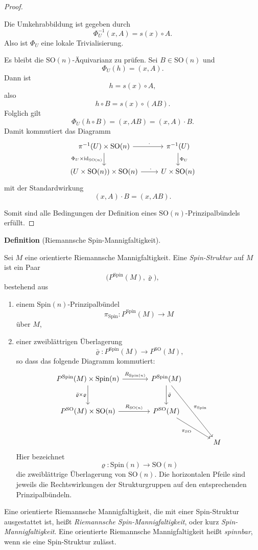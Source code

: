 \documentclass[10pt, letterpaper]{article}
\newcommand{\id}{\operatorname{id}}
\newcommand{\SO}{\mathrm{SO}}
\newcommand{\Spin}{\mathrm{Spin}}
\newcommand{\CustomHeading}[3]{%
  \par\medskip\noindent%
  \textbf{#1 #2} \textnormal{(#3)}.\enskip%
}
\newenvironment{DEF}[2]{\CustomHeading{Definition}{#1}{#2}}{}
\begin{document}
\begin{proof}
\begin{enumerate}
    Die Umkehrabbildung ist gegeben durch
    \[
    \Phi_U^{-1}(x,A)=s(x)\circ A.
    \]
    Also ist \(\Phi_U\) eine lokale Trivialisierung.

    Es bleibt die \(\SO(n)\)-Äquivarianz zu prüfen. Sei \(B\in \SO(n)\) und
    \[
    \Phi_U(h)=(x,A).
    \]
    Dann ist
    \[
    h=s(x)\circ A,
    \]
    also
    \[
    h\circ B = s(x)\circ (AB).
    \]
    Folglich gilt
    \[
    \Phi_U(h\circ B)=(x,AB)= (x,A)\cdot B.
    \]
    Damit kommutiert das Diagramm
    \[
    \begin{tikzcd}
    \pi^{-1}(U)\times \SO(n) \arrow[r,"\ \ \cdot\ "] \arrow[d,"\Phi_U\times \id_{\SO(n)}"'] & \pi^{-1}(U) \arrow[d,"\Phi_U"] \\
    (U\times \SO(n))\times \SO(n) \arrow[r,"\ \ \cdot\ "] & U\times \SO(n)
    \end{tikzcd}
    \]
    mit der Standardwirkung
    \[
    (x,A)\cdot B = (x,AB).
    \]
\end{enumerate}

Somit sind alle Bedingungen der Definition eines \(\SO(n)\)-Prinzipalbündels erfüllt.
\end{proof}


\begin{DEF}{}{Riemannsche Spin-Mannigfaltigkeit}
Sei \(M\) eine orientierte Riemannsche Mannigfaltigkeit. Eine \emph{Spin-Struktur}
auf \(M\) ist ein Paar
\[
\bigl(P^{\Spin}(M),\bar\varrho\bigr),
\]
bestehend aus
\begin{enumerate}
    \item einem \(\Spin(n)\)-Prinzipalbündel
    \[
    \pi_{\Spin}:P^{\Spin}(M)\to M
    \]
    über \(M\),
    \item einer zweiblättrigen Überlagerung
    \[
    \bar\varrho:P^{\Spin}(M)\to P^{\SO}(M),
    \]
    so dass das folgende Diagramm kommutiert:
    \[
    \begin{tikzcd}[column sep=large, row sep=large]
    P^{\Spin}(M)\times \Spin(n) \arrow[r,"R_{\Spin(n)}"] \arrow[d,"\bar\varrho\times \varrho"'] &
    P^{\Spin}(M) \arrow[rdd,"\pi_{\Spin}"] \arrow[d,"\bar\varrho"] & \\
    P^{\SO}(M)\times \SO(n) \arrow[r,"R_{\SO(n)}"] &
    P^{\SO}(M) \arrow[rd,"\pi_{\SO}"'] & \\
    & & M
    \end{tikzcd}
    \]
    Hier bezeichnet
    \[
    \varrho:\Spin(n)\to \SO(n)
    \]
    die zweiblättrige Überlagerung von \(\SO(n)\). Die horizontalen Pfeile sind
    jeweils die Rechtswirkungen der Strukturgruppen auf den entsprechenden
    Prinzipalbündeln.
\end{enumerate}


Eine orientierte Riemannsche Mannigfaltigkeit, die mit einer Spin-Struktur
ausgestattet ist, heißt \emph{Riemannsche Spin-Mannigfaltigkeit}, oder kurz \emph{Spin-Mannigfaltigkeit}. Eine orientierte Riemannsche Mannigfaltigkeit heißt \emph{spinnbar}, wenn sie eine Spin-Struktur zulässt.
\end{DEF}
\end{document}
